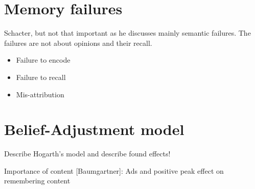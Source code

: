 \section{Memory failures}
Schacter, but not that important as he discusses mainly semantic failures.
The failures are not about opinions and their recall.

\begin{itemize}
\item Failure to encode
\item Failure to recall
\item Mis-attribution
\end{itemize}


\section{Belief-Adjustment model}
Describe Hogarth's model and describe found effects!

Importance of content [Baumgartner]: Ads and positive peak effect on remembering content
